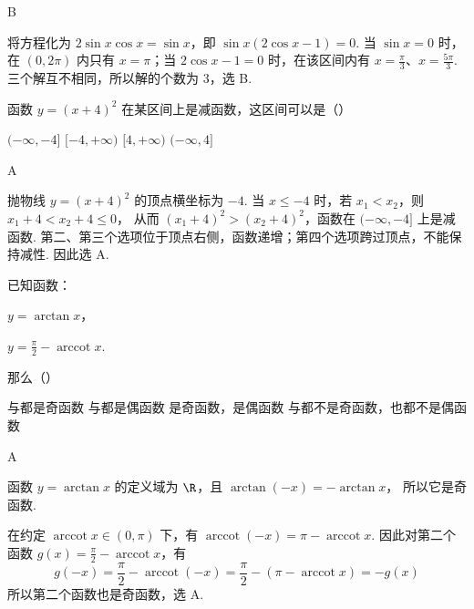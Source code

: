 \begin{answer}
B
\end{answer}

\begin{solution}
将方程化为
\(2\sin x\cos x=\sin x\)，即 \(\sin x(2\cos x-1)=0\).
当 \(\sin x=0\) 时，在 \((0,2\pi)\) 内只有 \(x=\pi\)；当 \(2\cos x-1=0\) 时，在该区间内有 \(x=\frac{\pi}{3}\)、\(x=\frac{5\pi}{3}\). 三个解互不相同，所以解的个数为 \(3\)，选 B.
\end{solution}

\begin{problem}
函数 \(y=(x+4)^2\) 在某区间上是减函数，这区间可以是（\quad）

\choices
    {\((-\infty,-4]\)}
    {\([-4, +\infty)\)}
    {\([4, +\infty)\)}
    {\((-\infty,4]\)}
\end{problem}

\begin{answer}
A
\end{answer}

\begin{solution}
抛物线 \(y=(x+4)^2\) 的顶点横坐标为 \(-4\). 当 \(x\leqslant-4\) 时，若 \(x_1<x_2\)，则
\(x_1+4<x_2+4\leqslant0\)，
从而 \((x_1+4)^2>(x_2+4)^2\)，函数在 \((-\infty,-4]\) 上是减函数. 第二、第三个选项位于顶点右侧，函数递增；第四个选项跨过顶点，不能保持减性. 因此选 A.
\end{solution}

\begin{problem}
已知函数：
\begin{circlelist}
\item \(y=\arctan x\)，
\item \(y=\frac{\pi}{2}-\operatorname{arccot} x\).
\end{circlelist}
那么（\quad）

\choices
    {与都是奇函数}
    {与都是偶函数}
    {是奇函数，是偶函数}
    {与都不是奇函数，也都不是偶函数}
\end{problem}

\begin{answer}
A
\end{answer}

\begin{solution}
函数 \(y=\arctan x\) 的定义域为 \(\R\)，且
\(\arctan(-x)=-\arctan x\)，
所以它是奇函数.

在约定 \(\operatorname{arccot}x\in(0,\pi)\) 下，有
\(\operatorname{arccot}(-x)=\pi-\operatorname{arccot}x\).
因此对第二个函数 \(g(x)=\frac{\pi}{2}-\operatorname{arccot}x\)，有
\[
g(-x)=\frac{\pi}{2}-\operatorname{arccot}(-x)
=\frac{\pi}{2}-\left(\pi-\operatorname{arccot}x\right)
=-g(x)
\]
所以第二个函数也是奇函数，选 A.
\end{solution}

